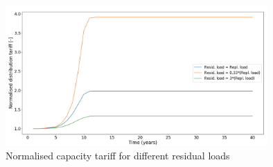 \noindent
\newline
\begin{figure}[h!]
    \centering
    \includegraphics[width=10cm]{AppendixA/DistNBresid.PNG}
    \caption{Normalised capacity tariff for different residual loads}
    \label{fig:T}
\end{figure}%
